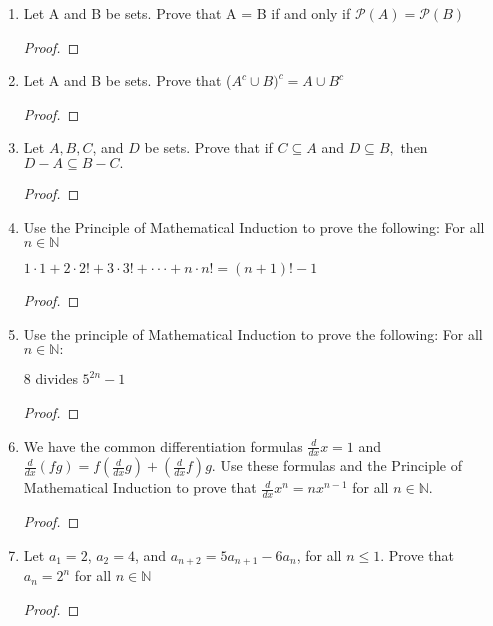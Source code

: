 \documentclass[11pt]{article}
\begin{document}
\begin{enumerate}
    \item Let A and B be sets. Prove that A = B if and only if $\mathscr{P}(A) = \mathscr{P}(B)$
        \begin{proof}
        \end{proof}
        
    \item Let A and B be sets. Prove that ($A^c \cup B)^c = A \cup B^c$
        \begin{proof}
        \end{proof}
        
    \item Let $A,B,C$, and $D$ be sets. Prove that if $C \subseteq A$ and $D \subseteq B,$ then $D-A\subseteq B-C.$
        \begin{proof}
        \end{proof}
        
    \item Use the Principle of Mathematical Induction to prove the following: \newline
    For all $n \in \mathbb{N}$
    \begin{center}
        $1\cdot1+2\cdot2!+3\cdot3!+\cdot \cdot \cdot + n\cdot n!=(n+1)!-1$
    \end{center}
        \begin{proof}
        \end{proof}
        
    \item Use the principle of Mathematical Induction to prove the following: For all $n \in \mathbb{N}:$
    \begin{center}
        8 divides $5^{2n} -1$
    \end{center}
        \begin{proof}
        \end{proof}
        
    \item We have the common differentiation formulas $\frac{d}{dx} x=1$ and $\frac{d}{dx}(fg)=f(\frac{d}{dx}g) + (\frac{d}{dx}f)g$. 
    \newline Use these formulas and the Principle of Mathematical Induction to prove that $\frac{d}{dx}x^n = nx^{n-1}$ for all $n \in \mathbb{N}$.
        \begin{proof}
        \end{proof}
        
    \item Let $a_1=2$, $a_2=4$, and $a_{n+2} = 5a_{n+1} - 6a_n$, for all $n \leq 1.$ Prove that $a_n = 2^n$ for all $n \in \mathbb{N}$
        \begin{proof}
        \end{proof}
        

\end{enumerate}
\end{document}

